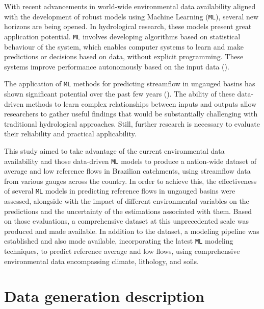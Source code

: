 \documentclass[12pt]{article}
\begin{document}
\par With recent advancements in world-wide environmental data availability aligned with the development of robust models using Machine Learning (\texttt{ML}), several new horizons are being opened. In hydrological research, these models present great application potential. \texttt{ML} involves developing algorithms based on statistical behaviour of the system, which enables computer systems to learn and make predictions or decisions based on data, without explicit programming. These systems improve performance autonomously based on the input data (\cite{kuhn2013}).

\par The application of \texttt{ML} methods for predicting streamflow in ungauged basins has shown significant potential over the past few years (\cite{ferreira2021, golian2021, potdar2021, worland2018}). The ability of these data-driven methods to learn complex relationships between inputs and outputs allow researchers to gather useful findings that would be substantially challenging with traditional hydrological approaches. Still, further research is necessary to evaluate their reliability and practical applicability.

\par This study aimed to take advantage of the current environmental data availability and those data-driven \texttt{ML} models to produce a nation-wide dataset of average and low reference flows in Brazilian catchments, using streamflow data from various gauges across the country. In order to achieve this, the effectiveness of several \texttt{ML} models in predicting reference flows in ungauged basins were assessed, alongside with the impact of different environmental variables on the predictions and the uncertainty of the estimations associated with them. Based on those evaluations, a comprehensive dataset at this unprecedented scale was produced and made available. In addition to the dataset, a modeling pipeline was established and also made available, incorporating the latest \texttt{ML} modeling techniques, to predict reference average and low flows, using comprehensive environmental data encompassing climate, lithology, and soils.


\section{Data generation description} \label{sec:datagen}
\end{document}
